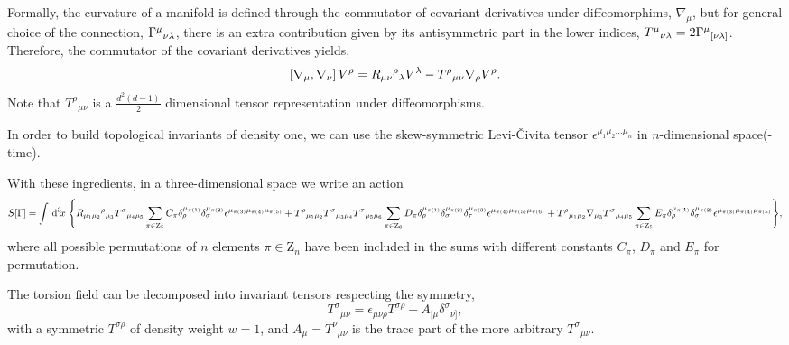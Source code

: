\documentclass[twocolumn,aps,
  showpacs,showkeys,prd,superscriptaddress]{revtex4-1}
\begin{document}
Formally, the curvature of a manifold is defined through the commutator of covariant derivatives under diffeomorphims, $\nabla_\mu$, but for general choice of the connection, $\Gamma^\mu{}_{\nu\lambda}$, there is an extra contribution given by its antisymmetric part in the lower indices, $T^\mu{}_{\nu\lambda} = 2\Gamma^\mu{}_{[\nu\lambda]}$. Therefore, the commutator of the covariant derivatives yields,
\begin{equation}
  \left[\nabla_{{\mu}},\nabla_{{\nu}}\right]V^\rho = R_{\mu\nu}{}^\rho{}_\lambda V^\lambda - T^\rho{}_{\mu\nu}\nabla_{{\rho}}V^\rho.
  \label{curvdef}
\end{equation}
Note that $T^\rho{}_{\mu\nu}$ is a $\tfrac{d^2(d-1)}{2}$ dimensional tensor representation under diffeomorphisms.

In order to build topological invariants of density one, we can use the skew-symmetric Levi-\v{C}ivita tensor $\epsilon^{\mu_1\mu_2\dots\mu_n}$ in $n$-dimensional space(-time).

\begin{widetext}
  With these ingredients, in a three-dimensional space we write an action 
  \begin{dmath}
    \label{accion3d}
    S[\Gamma] =
    \int \dn{3}{x}  \Bigg\{ R_{\mu_1\mu_2}{}^\rho{}_{\mu_3} T^\sigma{}_{\mu_4\mu_5} \sum_{\pi \in  \mathrm{Z}_5}C_\pi\delta_\rho^{\mu_{\pi(1)}} \delta_\sigma^{\mu_{\pi(2)}} \epsilon^{\mu_{\pi(3)}\mu_{\pi(4)}\mu_{\pi(5)}}  + T^\rho{}_{\mu_1\mu_2} T^\sigma{}_{\mu_3\mu_4} T^\tau{}_{\mu_5\mu_6} \sum_{\pi \in \mathrm{Z}_6}D_\pi\delta_\rho^{\mu_{\pi(1)}} \delta_\sigma^{\mu_{\pi(2)}}\delta_\tau^{\mu_{\pi(3)}}\epsilon^{\mu_{\pi(4)}\mu_{\pi(5)}\mu_{\pi(6)}} + T^\rho{}_{\mu_1\mu_2}\nabla_{\mu_3} T^\sigma{}_{\mu_4\mu_5}\sum_{\pi \in \mathrm Z_5}E_\pi\delta_\rho^{\mu_{\pi(1)}} \delta_\sigma^{\mu_{\pi(2)}}\epsilon^{\mu_{\pi(3)}\mu_{\pi(4)}\mu_{\pi(5)}} \Bigg\}, 
  \end{dmath}
  where all possible permutations of $n$ elements $\pi \in \mathrm{Z}_n$ have been included in the sums with  different constants $C_\pi$, $D_\pi$ and $E_\pi$ for  permutation. 
\end{widetext}

The torsion field can be decomposed into invariant tensors respecting the symmetry,
\begin{equation}
  T^\sigma{}_{\mu\nu} = \epsilon_{\mu\nu\rho} T^{\sigma\rho} + A_{[\mu}\delta^\sigma{}_{\nu]},
\end{equation}
with a symmetric $T^{\sigma\rho}$ of density weight  $w = 1$, and \mbox{$A_\mu = T^\nu{}_{\mu\nu}$} is the trace part of the more arbitrary $T^\sigma{}_{\mu\nu}$.
\end{document}
